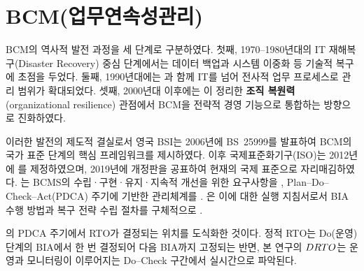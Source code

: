 \section{BCM(업무연속성관리)}
\label{sec:lit-bcm}


\citet{herbane2010disaster} BCM의 역사적 발전 과정을 세 단계로 구분하였다.
첫째, 1970--1980년대의 IT 재해복구(Disaster Recovery) 중심 단계에서는 데이터 백업과
시스템 이중화 등 기술적 복구에 초점을 두었다.
둘째, 1990년대에는 과 함께
IT를 넘어 전사적 업무 프로세스로 관리 범위가 확대되었다.
셋째, 2000년대 이후에는 \citet{bhamra2011resilience}이 정리한
\textbf{조직 복원력}(organizational resilience) 관점에서
BCM을 전략적 경영 기능으로 통합하는 방향으로 진화하였다.

이러한 발전의 제도적 결실로서 영국 BSI는 2006년에 BS~25999를 발표하여
BCM의 국가 표준 단계의 핵심 프레임워크를 제시하였다\citep{bs25999}.
이후 국제표준화기구(ISO)는 2012년에 를 제정하였으며,
2019년에 개정판을 공표하여 현재의 국제 표준으로 자리매김하였다.
는 BCMS의 수립·구현·유지·지속적 개선을 위한 요구사항을 , Plan--Do--Check--Act(PDCA) 주기에
기반한 관리체계를 .
은 이에 대한 실행 지침서로서 BIA 수행 방법과
복구 전략 수립 절차를 구체적으로 .

 의 PDCA 주기에서
RTO가 결정되는 위치를 도식화한 것이다. 정적 RTO는 Do(운영) 단계의 BIA에서 한 번
결정되어 다음 BIA까지 고정되는 반면, 본 연구의 $DRTO$는 운영과 모니터링이
이루어지는 Do--Check 구간에서 실시간으로 파악된다.

